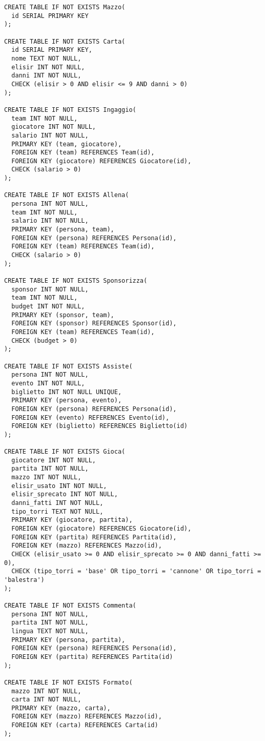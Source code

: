 \documentclass{article}
\begin{document}
\begin{lstlisting}
CREATE TABLE IF NOT EXISTS Mazzo(
  id SERIAL PRIMARY KEY
);

CREATE TABLE IF NOT EXISTS Carta(
  id SERIAL PRIMARY KEY,
  nome TEXT NOT NULL,
  elisir INT NOT NULL,
  danni INT NOT NULL,
  CHECK (elisir > 0 AND elisir <= 9 AND danni > 0)
);

CREATE TABLE IF NOT EXISTS Ingaggio(
  team INT NOT NULL,
  giocatore INT NOT NULL,
  salario INT NOT NULL,
  PRIMARY KEY (team, giocatore),
  FOREIGN KEY (team) REFERENCES Team(id),
  FOREIGN KEY (giocatore) REFERENCES Giocatore(id),
  CHECK (salario > 0)
);

CREATE TABLE IF NOT EXISTS Allena(
  persona INT NOT NULL,
  team INT NOT NULL,
  salario INT NOT NULL,
  PRIMARY KEY (persona, team),
  FOREIGN KEY (persona) REFERENCES Persona(id),
  FOREIGN KEY (team) REFERENCES Team(id),
  CHECK (salario > 0)
);

CREATE TABLE IF NOT EXISTS Sponsorizza(
  sponsor INT NOT NULL,
  team INT NOT NULL,
  budget INT NOT NULL,
  PRIMARY KEY (sponsor, team),
  FOREIGN KEY (sponsor) REFERENCES Sponsor(id),
  FOREIGN KEY (team) REFERENCES Team(id),
  CHECK (budget > 0)
);

CREATE TABLE IF NOT EXISTS Assiste(
  persona INT NOT NULL,
  evento INT NOT NULL,
  biglietto INT NOT NULL UNIQUE,
  PRIMARY KEY (persona, evento),
  FOREIGN KEY (persona) REFERENCES Persona(id),
  FOREIGN KEY (evento) REFERENCES Evento(id),
  FOREIGN KEY (biglietto) REFERENCES Biglietto(id)
);

CREATE TABLE IF NOT EXISTS Gioca(
  giocatore INT NOT NULL,
  partita INT NOT NULL,
  mazzo INT NOT NULL,
  elisir_usato INT NOT NULL,
  elisir_sprecato INT NOT NULL,
  danni_fatti INT NOT NULL,
  tipo_torri TEXT NOT NULL,
  PRIMARY KEY (giocatore, partita),
  FOREIGN KEY (giocatore) REFERENCES Giocatore(id),
  FOREIGN KEY (partita) REFERENCES Partita(id),
  FOREIGN KEY (mazzo) REFERENCES Mazzo(id),
  CHECK (elisir_usato >= 0 AND elisir_sprecato >= 0 AND danni_fatti >= 0),
  CHECK (tipo_torri = 'base' OR tipo_torri = 'cannone' OR tipo_torri = 'balestra')
);

CREATE TABLE IF NOT EXISTS Commenta(
  persona INT NOT NULL,
  partita INT NOT NULL,
  lingua TEXT NOT NULL,
  PRIMARY KEY (persona, partita),
  FOREIGN KEY (persona) REFERENCES Persona(id),
  FOREIGN KEY (partita) REFERENCES Partita(id)
);

CREATE TABLE IF NOT EXISTS Formato(
  mazzo INT NOT NULL,
  carta INT NOT NULL,
  PRIMARY KEY (mazzo, carta),
  FOREIGN KEY (mazzo) REFERENCES Mazzo(id),
  FOREIGN KEY (carta) REFERENCES Carta(id)
);


\end{lstlisting}
\end{document}
